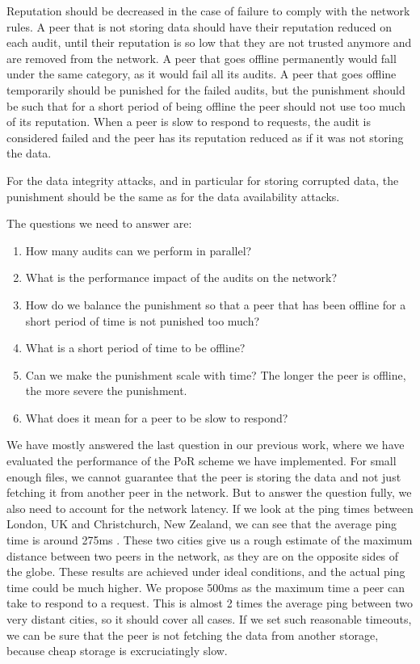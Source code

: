Reputation should be decreased in the case of failure to comply with the network rules.
A peer that is not storing data should have their reputation reduced on each audit,
until their reputation is so low that they are not trusted anymore and are removed from the network.
A peer that goes offline permanently would fall under the same category, as it would fail all its audits.
A peer that goes offline temporarily should be punished for the failed audits,
but the punishment should be such that for a short period of being offline the peer should not use 
too much of its reputation.
When a peer is slow to respond to requests, the audit is considered failed and the peer has
its reputation reduced as if it was not storing the data.

For the data integrity attacks, and in particular for storing corrupted data,
the punishment should be the same as for the data availability attacks.

The questions we need to answer are:
\begin{enumerate}
    \item How many audits can we perform in parallel?
    \item What is the performance impact of the audits on the network?
    \item How do we balance the punishment so that a peer that has been offline for a short period of time
        is not punished too much?
    \item What is a short period of time to be offline?
    \item Can we make the punishment scale with time? The longer the peer is offline, the more severe the punishment.
    \item What does it mean for a peer to be slow to respond?
\end{enumerate}

We have mostly answered the last question in our previous work, where we have evaluated the performance of
the PoR scheme we have implemented.
For small enough files, we cannot guarantee that the peer is storing the data
and not just fetching it from another peer in the network.
But to answer the question fully, we also need to account for the network latency.
If we look at the ping times between London, UK and Christchurch, New Zealand,
we can see that the average ping time is around 275ms \cite{pingtimes}.
These two cities give us a rough estimate of the maximum distance between two peers in the network,
as they are on the opposite sides of the globe.
These results are achieved under ideal conditions, and the actual ping time could be much higher.
We propose 500ms as the maximum time a peer can take to respond to a request.
This is almost 2 times the average ping between two very distant cities, so it should cover all cases.
If we set such reasonable timeouts, we can be sure that the peer is not
fetching the data from another storage, because cheap storage is excruciatingly slow.

